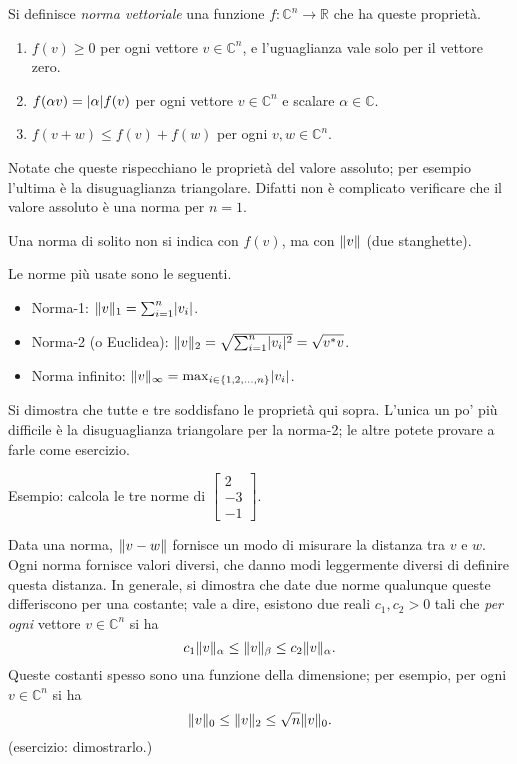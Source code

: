 \documentclass[a4paper]{report}
\DeclarePairedDelimiter{\abs}{\lvert}{\rvert}
\DeclarePairedDelimiter{\norm}{\lVert}{\rVert}
\theoremstyle{definiton}
\theoremstyle{remark}
\begin{document}
Si definisce \emph{norma vettoriale} una funzione $f: \mathbb{C}^n \to \mathbb{R}$ che ha queste proprietà.
\begin{enumerate}
    \item $f(v) \geq 0$ per ogni vettore $v\in\mathbb{C}^n$, e l'uguaglianza vale solo per il vettore zero.
    \item $f(\alpha v) = \abs{\alpha} f(v)$ per ogni vettore $v\in\mathbb{C}^n$ e scalare $\alpha \in \mathbb{C}$.
    \item $f(v+w) \leq f(v) + f(w)$ per ogni $v,w\in\mathbb{C}^n$.
\end{enumerate}

Notate che queste rispecchiano le proprietà del valore assoluto; per esempio l'ultima è la disuguaglianza triangolare. Difatti non è complicato verificare che il valore assoluto è una norma per $n=1$.

Una norma di solito non si indica con $f(v)$, ma con $\norm{v}$ (due stanghette).

Le norme più usate sono le seguenti.

\begin{itemize}
    \item Norma-1: $\norm{v}_1 = \sum_{i=1}^n \abs{v_i}$.
    \item Norma-2 (o Euclidea): $\norm{v}_2 = \sqrt{\sum_{i=1}^n \abs{v_i}^2} = \sqrt{v^*v}$.
    \item Norma infinito: $\norm{v}_\infty = \max_{i\in \{1,2,\dots,n\}} \abs{v_i}$.
\end{itemize}
Si dimostra che tutte e tre soddisfano le proprietà qui sopra. L'unica un po' più difficile è la disuguaglianza triangolare per la norma-2; le altre potete provare a farle come esercizio.

Esempio: calcola le tre norme di $\begin{bmatrix}
    2\\-3\\-1
\end{bmatrix}$.

Data una norma, $\norm{v-w}$ fornisce un modo di misurare la distanza tra $v$ e $w$. Ogni norma fornisce valori diversi, che danno modi leggermente diversi di definire questa distanza. In generale, si dimostra che date due norme qualunque queste differiscono per una costante; vale a dire, esistono due reali $c_1,c_2 > 0$ tali che \emph{per ogni} vettore $v\in\mathbb{C}^n$ si ha
\[
c_1\norm{v}_\alpha \leq \norm{v}_\beta \leq c_2 \norm{v}_\alpha.
\]
Queste costanti spesso sono una funzione della dimensione; per esempio, per ogni $v\in\mathbb{C}^n$ si ha
\[
\norm{v}_0 \leq \norm{v}_2 \leq \sqrt{n}\norm{v}_0.
\]
(esercizio: dimostrarlo.)
\end{document}
